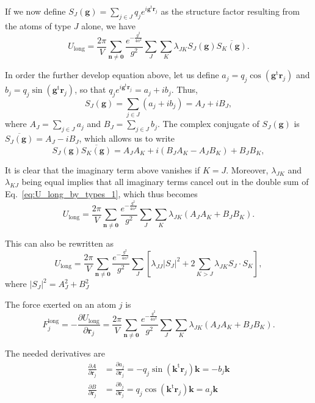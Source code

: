 \documentclass[11pt]{article}
\newcommand{\vt}[1]{\boldsymbol{\mathbf{#1}}}           %
\newcommand{\tr}[1]{#1^\text{t}}                        %
\begin{document}
If we now define $S_J(\vt g) = \sum_{j \in J} q_j e^{i \tr{\vt g}{\vt r}_j}$ as the structure factor resulting from the atoms of type $J$ alone, we have
\begin{equation}
\label{eq:U_long_by_types_1}
U_\text{long} = \frac{2\pi}{V}\sum_{\vt n \neq \vt 0} \frac{e^{-\frac{g^2}{4\alpha^2}}}{g^2} \sum_J \sum_K \lambda_{JK} S_J(\vt g) \overline{S_K(\vt g)}.
\end{equation}

In order the further develop equation above, let us define $a_j = q_j \cos(\tr{\vt g}{\vt r}_j)$ and $b_j = q_j \sin(\tr{\vt g}{\vt r}_j)$, so that $q_j e^{i \tr{\vt g}{\vt r}_j} = a_j + ib_j$. Thus,
\begin{equation*}
S_J(\vt g) = \sum_{j \in J} (a_j + i b_j) = A_J + i B_J,
\end{equation*}
where $A_J = \sum_{j \in J} a_j$ and $B_J = \sum_{j \in J} b_j$. The complex conjugate of $S_J(\vt g)$ is $\overline{S_J(\vt g)} = A_J - i B_J$, which allows us to write
\begin{equation*}
S_J(\vt g)\overline{S_K(\vt g)} = A_J A_K + i(B_J A_K - A_J B_K) + B_J B_K,
\end{equation*}

It is clear that the imaginary term above vanishes if $K = J$. Moreover, $\lambda_{JK}$ and $\lambda_{KJ}$ being equal implies that all imaginary terms cancel out in the double sum of Eq.~\ref{eq:U_long_by_types_1}, which thus becomes
\begin{equation*}
U_\text{long} = \frac{2\pi}{V}\sum_{\vt n \neq \vt 0} \frac{e^{-\frac{g^2}{4\alpha^2}}}{g^2} \sum_J \sum_K \lambda_{JK} (A_J A_K + B_J B_K).
\end{equation*}

This can also be rewritten as
\begin{equation*}
U_\text{long} = \frac{2\pi}{V}\sum_{\vt n \neq \vt 0} \frac{e^{-\frac{g^2}{4\alpha^2}}}{g^2} \sum_J \left[\lambda_{JJ} |S_J|^2 + 2 \sum_{K>J} \lambda_{JK} S_J \cdot S_K\right],
\end{equation*}
where $|S_J|^2 = A_J^2 + B_J^2$


The force exerted on an atom $j$ is
\begin{equation*}
F_j^\text{long} = -\frac{\partial U_\text{long}}{\partial \vt r_j} = \frac{2\pi}{V}\sum_{\vt n \neq \vt 0} \frac{e^{-\frac{g^2}{4\alpha^2}}}{g^2} \sum_J \sum_K \lambda_{JK} (A_J A_K + B_J B_K).
\end{equation*}

The needed derivatives are
\begin{align*}
\frac{\partial A}{\partial \vt r_j} &= \frac{\partial a_j}{\partial \vt r_j} = -q_j \sin(\tr{\vt k}{\vt r}_j){\vt k} = -b_j{\vt k} \\
\frac{\partial B}{\partial \vt r_j} &= \frac{\partial b_j}{\partial \vt r_j} = q_j \cos(\tr{\vt k}{\vt r}_j){\vt k} = a_j{\vt k}
\end{align*}
\end{document}
